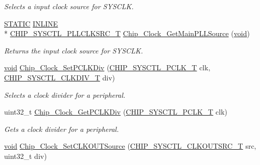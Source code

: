 \begin{DoxyCompactItemize}
\begin{DoxyCompactList}\small\item\em Selects a input clock source for S\-Y\-S\-C\-L\-K. \end{DoxyCompactList}\item 
\hyperlink{group__LPC__Types__Public__Macros_ga10b2d890d871e1489bb02b7e70d9bdfb}{S\-T\-A\-T\-I\-C} \hyperlink{group__LPC__Types__Public__Types_ga2eb6f9e0395b47b8d5e3eeae4fe0c116}{I\-N\-L\-I\-N\-E} \\*
\hyperlink{group__CLOCK__17XX__40XX_gacda7fd6d13922330ce9344dbc4ec85b7}{C\-H\-I\-P\-\_\-\-S\-Y\-S\-C\-T\-L\-\_\-\-P\-L\-L\-C\-L\-K\-S\-R\-C\-\_\-\-T} \hyperlink{group__CLOCK__17XX__40XX_gaf678411ef6cde49c95c603030554fa9d}{Chip\-\_\-\-Clock\-\_\-\-Get\-Main\-P\-L\-L\-Source} (\hyperlink{Paradigm_2Tern__EE_2small_2portmacro_8h_a14d32f8130d3c0b212cfc751730b5b49}{void})
\begin{DoxyCompactList}\small\item\em Returns the input clock source for S\-Y\-S\-C\-L\-K. \end{DoxyCompactList}\item 
\hyperlink{Paradigm_2Tern__EE_2small_2portmacro_8h_a14d32f8130d3c0b212cfc751730b5b49}{void} \hyperlink{group__CLOCK__17XX__40XX_gab218e9b1ee5377bd662e516420e863ea}{Chip\-\_\-\-Clock\-\_\-\-Set\-P\-C\-L\-K\-Div} (\hyperlink{group__CLOCK__17XX__40XX_ga7af78c5752bdd11a908ec9b11e2ecffc}{C\-H\-I\-P\-\_\-\-S\-Y\-S\-C\-T\-L\-\_\-\-P\-C\-L\-K\-\_\-\-T} clk, \hyperlink{group__CLOCK__17XX__40XX_gab4cd58034824b8c55c223a280dbe4f5f}{C\-H\-I\-P\-\_\-\-S\-Y\-S\-C\-T\-L\-\_\-\-C\-L\-K\-D\-I\-V\-\_\-\-T} div)
\begin{DoxyCompactList}\small\item\em Selects a clock divider for a peripheral. \end{DoxyCompactList}\item 
uint32\-\_\-t \hyperlink{group__CLOCK__17XX__40XX_gae547e3a0b782d9ef8135f98bd92fc9e8}{Chip\-\_\-\-Clock\-\_\-\-Get\-P\-C\-L\-K\-Div} (\hyperlink{group__CLOCK__17XX__40XX_ga7af78c5752bdd11a908ec9b11e2ecffc}{C\-H\-I\-P\-\_\-\-S\-Y\-S\-C\-T\-L\-\_\-\-P\-C\-L\-K\-\_\-\-T} clk)
\begin{DoxyCompactList}\small\item\em Gets a clock divider for a peripheral. \end{DoxyCompactList}\item 
\hyperlink{Paradigm_2Tern__EE_2small_2portmacro_8h_a14d32f8130d3c0b212cfc751730b5b49}{void} \hyperlink{group__CLOCK__17XX__40XX_ga0e8ed739d1ffa5480fc028b08a751d28}{Chip\-\_\-\-Clock\-\_\-\-Set\-C\-L\-K\-O\-U\-T\-Source} (\hyperlink{group__CLOCK__17XX__40XX_ga157c4adb8f619a3aaf58dacca66a9292}{C\-H\-I\-P\-\_\-\-S\-Y\-S\-C\-T\-L\-\_\-\-C\-L\-K\-O\-U\-T\-S\-R\-C\-\_\-\-T} src, uint32\-\_\-t div)

\end{DoxyCompactItemize}
